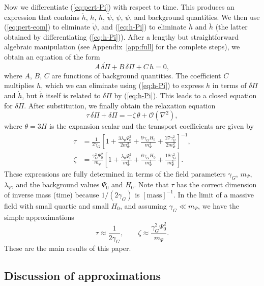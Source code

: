 \documentclass[aps,prd,reprint,superscriptaddress,floatfix]{revtex4-2}
\begin{document}
Now we differentiate (\ref{eq:pert-Pi}) with respect to time. This produces an expression that contains $\ddot h$, $\dot h$, $h$, $\ddot\psi$, $\dot\psi$, $\psi$, and background quantities. We then use (\ref{eq:pert-eom}) to eliminate $\ddot\psi$, and (\ref{eq:h-Pi}) to eliminate $\dot h$ and $\ddot h$ (the latter obtained by differentiating (\ref{eq:h-Pi})). After a lengthy but straightforward algebraic manipulation (see Appendix~\ref{app:full} for the complete steps), we obtain an equation of the form
\begin{equation}
A \,\dot{\delta\Pi} + B \,\delta\Pi + C \,h = 0,
\label{eq:intermediate}
\end{equation}
where $A$, $B$, $C$ are functions of background quantities. The coefficient $C$ multiplies $h$, which we can eliminate using (\ref{eq:h-Pi}) to express $h$ in terms of $\delta\Pi$ and $\dot h$, but $\dot h$ itself is related to $\delta\Pi$ by (\ref{eq:h-Pi}). This leads to a closed equation for $\delta\Pi$. After substitution, we finally obtain the relaxation equation
\begin{equation}
\tau \,\dot{\delta\Pi} + \delta\Pi = -\zeta \,\theta + \mathcal{O}(\nabla^2),
\label{eq:relax}
\end{equation}
where $\theta = 3H$ is the expansion scalar and the transport coefficients are given by
\begin{align}
\tau &= \frac{1}{2\gamma_G} \left[1 + \frac{3\lambda_\Psi\Psi_0^2}{2m_\Psi^2} + \frac{9\gamma_G H_0}{m_\Psi^2} + \frac{27\gamma_G^2}{2m_\Psi^2} \right]^{-1}, \label{eq:tau}\\
\zeta &= \frac{\gamma_G^2 \Psi_0^2}{m_\Psi} \left[1 + \frac{\lambda_\Psi\Psi_0^2}{m_\Psi^2} + \frac{6\gamma_G H_0}{m_\Psi^2} + \frac{18\gamma_G^2}{m_\Psi^2} \right].
\label{eq:zeta}
\end{align}
These expressions are fully determined in terms of the field parameters $\gamma_G$, $m_\Psi$, $\lambda_\Psi$, and the background values $\Psi_0$ and $H_0$. Note that $\tau$ has the correct dimension of inverse mass (time) because $1/(2\gamma_G)$ is $[\text{mass}]^{-1}$. In the limit of a massive field with small quartic and small $H_0$, and assuming $\gamma_G \ll m_\Psi$, we have the simple approximations
\begin{equation}
\tau \approx \frac{1}{2\gamma_G}, \qquad \zeta \approx \frac{\gamma_G^2 \Psi_0^2}{m_\Psi}.
\label{eq:tau-zeta-simple}
\end{equation}
These are the main results of this paper.

\subsection{Discussion of approximations}
\label{subsec:approx}
\end{document}
